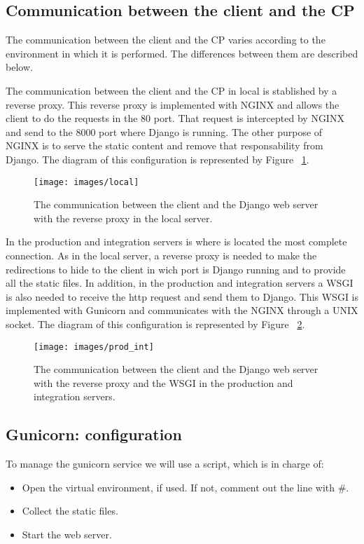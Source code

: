 \documentclass[a4paper,12pt]{article}
\begin{document}
\subsection{Communication between the client and the CP}
The communication between the client and the CP varies according to the environment in which it is performed.
The differences between them are described below.

The communication between the client and the CP in local is stablished by a reverse proxy. This reverse proxy is implemented with
NGINX and allows the client to do the requests in the 80 port. That request is intercepted by NGINX and send to the 8000
port where Django is running. The other purpose of NGINX is to serve the static content and remove that responsability from Django.
The diagram of this configuration is represented by Figure ~\ref{fig:local_architecture}.

\begin{figure}[!ht]
    \centering
    \texttt{[image: images/local]}
    \caption{The communication between the client and the Django web server with the reverse proxy in the local server.}
    \label{fig:local_architecture}
\end{figure}

In the production and integration servers is where is located the most complete connection. As in the local server, a reverse proxy is needed to
make the redirections to hide to the client in wich port is Django running and to provide all the static files. In addition, in the production
and integration servers a WSGI is also needed to receive the http request and send them to Django. This WSGI is implemented with Gunicorn and
communicates with the NGINX through a UNIX socket. The diagram of this configuration is represented by Figure ~\ref{fig:prod_int_architecture}.


\begin{figure}[!ht]
    \centering
    \texttt{[image: images/prod\_int]}
    \caption{The communication between the client and the Django web server with the reverse proxy and the WSGI in the production and integration servers.}
    \label{fig:prod_int_architecture}
\end{figure}

\subsection{Gunicorn: configuration}
To manage the gunicorn service we will use a script, which is in charge of:
\begin{itemize}
    \item Open the virtual environment, if used. If not, comment out the line with \#.
    \item Collect the static files.
    \item Start the web server.
\end{itemize}
\end{document}
